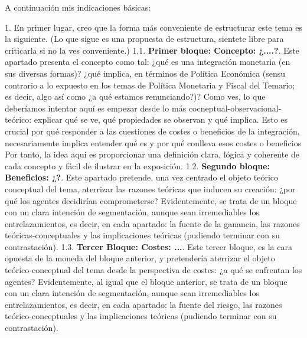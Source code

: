 \documentclass[10pt,a4paper]{article}
\begin{document}
{{    A continuación mis indicaciones básicas:
    
    1. En primer lugar, creo que la forma más conveniente de estructurar este tema es la siguiente. (Lo que sigue es una propuesta de estructura, sientete libre para criticarla si no la ves conveniente.)
    1.1. \textbf{Primer bloque: Concepto: ¿....?}. Este apartado presenta el concepto como tal: ¿qué es una integración monetaria (en sus diversas formas)? ¿qué implica, en términos de Política Económica (sensu contrario a lo expuesto en los temas de Política Monetaria y Fiscal del Temario; es decir, algo así como ¿a qué estamos renunciando?)? Como ves, lo que deberíamos intentar aquí es empezar desde lo más cocneptual-observacional-teórico: explicar qué se ve, qué propiedades se observan y qué implica. Esto es crucial por qué responder a las cuestiones de costes o beneficios de la integración, necesariamente implica entender qué es y por qué conlleva esos costes o beneficios
    Por tanto, la idea aquí es proporcionar una definición clara, lógica y coherente de cada concepto y fácil de ilustrar en la exposición. 
    1.2. \textbf{Segundo bloque: Beneficios: ¿?}. Este apartado pretende, una vez centrado el objeto teórico conceptual del tema, aterrizar las razones teóricas que inducen su creación: ¿por qué los agentes decidirían comprometerse? Evidentemente, se trata de un bloque con un clara intención de segmentación, aunque sean irremediables los entrelazamientos, es decir, en cada apartado: la fuente de la ganancia, las razones teóricas-conceptuales y las implicaciones teóricas (pudiendo terminar con su contrastación). 
    1.3. \textbf{Tercer Bloque: Costes: ...}. Este tercer bloque, es la cara opuesta de la moneda del bloque anterior, y pretendería aterrizar el objeto teórico-conceptual del tema desde la perspectiva de costes: ¿a qué se enfrentan los agentes? Evidentemente, al igual que el bloque anterior, se trata de un bloque con un clara intención de segmentación, aunque sean irremediables los entrelazamientos, es decir, en cada apartado: la fuente del riesgo, las razones teórico-conceptuales y las implicaciones teóricas (pudiendo terminar con su contrastación). 
    
}}
\end{document}
